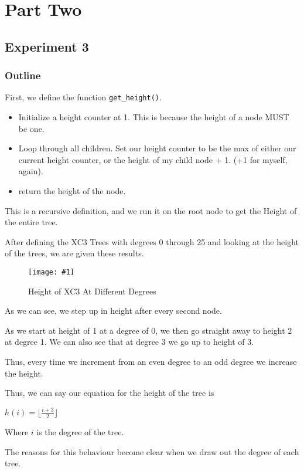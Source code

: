 \documentclass{article}
\newcommand{\figureInsetScaled}[3]
{
    \FloatBarrier{}
    \figureRaw{#1}{#2}{#3}
    \FloatBarrier{}
}
\newcommand{\figureRaw}[3]
{
    \begin{figure}[ht!]
        \centering
        \texttt{[image: \#1]}
        \caption{#2}
    \end{figure}
}
\begin{document}
\newpage
\section{Part Two}
\subsection{Experiment 3}

\subsubsection{Outline}

First, we define the function \verb|get_height()|.

\begin{itemize}
    \item Initialize a height counter at 1. This is because the height of a node MUST be one.
    \item Loop through all children. Set our height counter to be the max of either our current height counter, or the height of my child node + 1. (+1 for myself, again).
    \item return the height of the node.
\end{itemize}

This is a recursive definition, and we run it on the root node to get the Height of the entire tree.

After defining the XC3 Trees with degrees 0 through 25 and looking at the height of the trees, we are given these results.

\figureInsetScaled{images/experiment3/Figure_1.png}{Height of XC3 At Different Degrees}{0.65}

As we can see, we step up in height after every second node.

As we start at height of 1 at a degree of 0, we then go straight away to height 2 at degree 1. We can also see that at degree 3 we go up to height of 3.

Thus, every time we increment from an even degree to an odd degree we increase the height.

Thus, we can say our equation for the height of the tree is 
\\
{
\Large
\begin{center}
    $h(i) = \lfloor \frac{i+3}{2} \rfloor$\\
    $ $
\end{center}
}
Where $i$ is the degree of the tree.

The reasons for this behaviour become clear when we draw out the degree of each tree.
\end{document}
